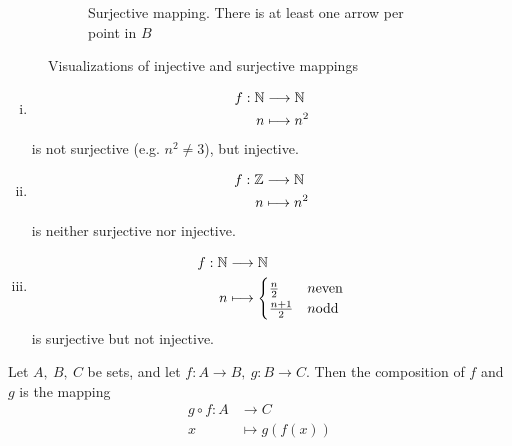 \documentclass[../../script.tex]{subfiles}
\begin{document}
\begin{defi}
\begin{figure}[h]
\begin{subfigure}[b]{0.45\textwidth}
		\caption{Surjective mapping. There is at least one arrow per point in $B$}
	\end{subfigure}
	\caption{Visualizations of injective and surjective mappings}
\end{figure}
\end{defi}

\begin{eg}\leavevmode
\begin{enumerate}[(i)]
	\item 
	\begin{align*}
	f: \mathbb{N} &\longrightarrow \mathbb{N} \\
	n &\longmapsto n^2
	\end{align*}
	is not surjective (e.g. $n^2 \ne 3$), but injective.
	\item 
	\begin{align*}
	f: \mathbb{Z} &\longrightarrow \mathbb{N} \\
	n &\longmapsto n^2
	\end{align*}
	is neither surjective nor injective.
	\item 
	\begin{align*}
	f: \mathbb{N} &\longrightarrow \mathbb{N} \\
	n &\longmapsto 
	\begin{cases}
		\frac{n}{2} & n \text{even} \\
		\frac{n+1}{2} & n \text{odd}
	\end{cases}
	\end{align*}
	is surjective but not injective.
\end{enumerate}
\end{eg}

\begin{defi}
Let $A, ~B, ~C$ be sets, and let $f: A \rightarrow B, ~g: B \rightarrow C$. Then the composition of $f$ and $g$ is the mapping
\begin{align*}
	g \circ f : A &\longrightarrow C \\
	x &\longmapsto g(f(x))
\end{align*}
\end{defi}
\end{document}
